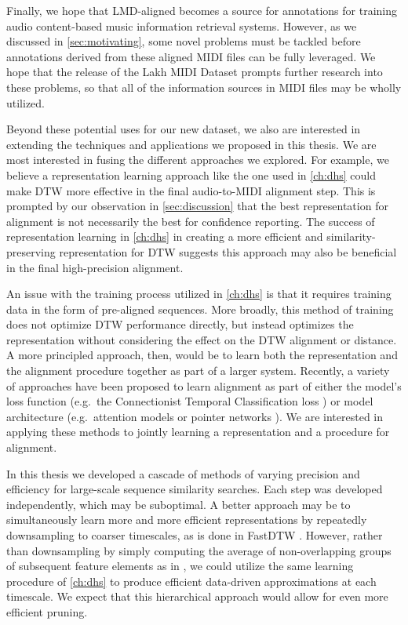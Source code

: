 Finally, we hope that LMD-aligned becomes a source for annotations for training audio content-based music information retrieval systems.
However, as we discussed in \cref{sec:motivating}, some novel problems must be tackled before annotations derived from these aligned MIDI files can be fully leveraged.
We hope that the release of the Lakh MIDI Dataset prompts further research into these problems, so that all of the information sources in MIDI files may be wholly utilized.

Beyond these potential uses for our new dataset, we also are interested in extending the techniques and applications we proposed in this thesis.
We are most interested in fusing the different approaches we explored.
For example, we believe a representation learning approach like the one used in \cref{ch:dhs} could make DTW more effective in the final audio-to-MIDI alignment step.
This is prompted by our observation in \cref{sec:discussion} that the best representation for alignment is not necessarily the best for confidence reporting.
The success of representation learning in \cref{ch:dhs} in creating a more efficient and similarity-preserving representation for DTW suggests this approach may also be beneficial in the final high-precision alignment.

An issue with the training process utilized in \cref{ch:dhs} is that it requires training data in the form of pre-aligned sequences.
More broadly, this method of training does not optimize DTW performance directly, but instead optimizes the representation without considering the effect on the DTW alignment or distance.
A more principled approach, then, would be to learn both the representation and the alignment procedure together as part of a larger system.
Recently, a variety of approaches have been proposed to learn alignment as part of either the model's loss function (e.g.\ the Connectionist Temporal Classification loss \cite{graves2006connectionist}) or model architecture (e.g.\ attention models \cite{bahdanau2014neural} or pointer networks \cite{vinyals2015pointer}).
We are interested in applying these methods to jointly learning a representation and a procedure for alignment.

In this thesis we developed a cascade of methods of varying precision and efficiency for large-scale sequence similarity searches.
Each step was developed independently, which may be suboptimal.
A better approach may be to simultaneously learn more and more efficient representations by repeatedly downsampling to coarser timescales, as is done in FastDTW \cite{salvador2007toward}.
However, rather than downsampling by simply computing the average of non-overlapping groups of subsequent feature elements as in \cite{salvador2007toward}, we could utilize the same learning procedure of \cref{ch:dhs} to produce efficient data-driven approximations at each timescale.
We expect that this hierarchical approach would allow for even more efficient pruning.

